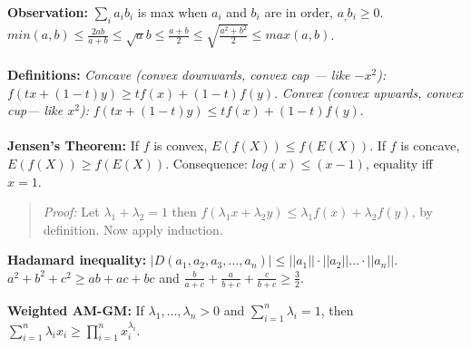 {\bf Observation:} $\sum_i a_i b_i$ is max when $a_i$ and $b_i$ are in order, $a_, b_i \geq 0$.
$min(a,b) \leq {\frac {2ab} {a+b}} \leq
{\sqrt ab} \leq {\frac {a+b} 2} \leq
{\sqrt {\frac {a^2 + b^2} 2}} \leq max(a,b)$.
\\
\\
{\bf Definitions:}
\emph{Concave (convex downwards, convex cap --- like $-x^2$):}
$f( tx+(1-t)y) \geq tf(x)+(1-t)f(y)$.  
\emph{Convex (convex upwards, convex cup--- like $x^2$):}
$f( tx+(1-t)y) \leq tf(x)+(1-t)f(y)$.
\\
\\
{\bf Jensen's Theorem:} If $f$ is convex, $E(f(X)) \leq f(E(X))$.
If $f$ is concave, $E(f(X)) \geq f(E(X))$.
Consequence:
$log(x) \leq (x-1)$, equality iff $x=1$.
\begin{quote}
\emph{Proof:} Let $\lambda_1 + \lambda_2 = 1$ then $f(\lambda_1 x + \lambda_2 y) \leq
\lambda_1 f(x) + \lambda_2 f(y)$, by definition. Now apply induction.
\end{quote}
{\bf Hadamard inequality:}
$|D(a_1 , a_2 , a_3 , \ldots , a_n )| \leq ||a_1 || \cdot ||a_2 || \ldots
\cdot ||a_n ||$.
$a^2 + b^2 + c^2 \geq ab + ac + bc$ and
${\frac {b} {a+c}} + {\frac {a} {b+c}} + {\frac {c} {b+c}} \geq {\frac {3}
{2}}$.
\begin{quote}
\end{quote}
{\bf Weighted AM-GM:}  If
$\lambda_1, \ldots , \lambda_n >0$ and
$\sum_{i=1}^n \lambda_i= 1$, then
$\sum_{i=1}^n \lambda_i x_i \geq \prod_{i=1}^n x_i^{\lambda_i}$.
